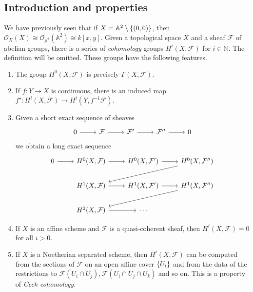 \subsection{Introduction and properties}
We have previously seen that if \( X = \mathbb A^2 \setminus \qty{(0, 0)} \), then \( \mathcal O_X(X) \cong \mathcal O_{\mathbb A^2}(\mathbb A^2) \cong k[x, y] \).
Given a topological space \( X \) and a sheaf \( \mathcal F \) of abelian groups, there is a series of \emph{cohomology} groups \( H^i(X, \mathcal F) \) for \( i \in \mathbb N \).
The definition will be omitted.
These groups have the following features.
\begin{enumerate}
    \item The group \( H^0(X, \mathcal F) \) is precisely \( \Gamma(X, \mathcal F) \).
    \item If \( f : Y \to X \) is continuous, there is an induced map \( f^\star : H^i(X, \mathcal F) \to H^i(Y, f^{-1} \mathcal F) \).
    \item Given a short exact sequence of sheaves
\[\begin{tikzcd}
	0 & {\mathcal F} & {\mathcal F'} & {\mathcal F''} & 0
	\arrow[from=1-1, to=1-2]
	\arrow[from=1-2, to=1-3]
	\arrow[from=1-3, to=1-4]
	\arrow[from=1-4, to=1-5]
\end{tikzcd}\]
    we obtain a long exact sequence
\[\begin{tikzcd}
	0 & {H^0(X, \mathcal F)} & {H^0(X, \mathcal F')} & {H^0(X, \mathcal F'')} \\
	& {H^1(X, \mathcal F)} & {H^1(X, \mathcal F')} & {H^1(X, \mathcal F'')} \\
	& {H^2(X, \mathcal F)} & \cdots
	\arrow[from=1-1, to=1-2]
	\arrow[from=1-2, to=1-3]
	\arrow[from=1-3, to=1-4]
	\arrow[from=1-4, to=2-2]
	\arrow[from=2-2, to=2-3]
	\arrow[from=2-3, to=2-4]
	\arrow[from=2-4, to=3-2]
	\arrow[from=3-2, to=3-3]
\end{tikzcd}\]
	\item If \( X \) is an affine scheme and \( \mathcal F \) is a quasi-coherent sheaf, then \( H^i(X, \mathcal F) = 0 \) for all \( i > 0 \).
	\item If \( X \) is a Noetherian separated scheme, then \( H^i(X, \mathcal F) \) can be computed from the sections of \( \mathcal F \) on an open affine cover \( \qty{U_i} \) and from the data of the restrictions to \( \mathcal F(U_i \cap U_j), \mathcal F(U_i \cap U_j \cap U_k) \) and so on.
	This is a property of \emph{\v{C}ech cohomology}.
\end{enumerate}

